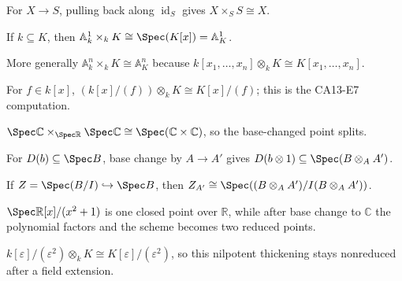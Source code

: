 \begin{example}\label{ex:vi24-r01}
For $X\to S$, pulling back along $\operatorname{id}_S$ gives $X\times_SS\cong X$.
\end{example}

\begin{example}\label{ex:vi24-r02}
If $k\subseteq K$, then $\mathbb A^1_k\times_kK\cong\Spec(K[x])=\mathbb A^1_K$.
\end{example}

\begin{example}\label{ex:vi24-r03}
More generally $\mathbb A^n_k\times_kK\cong\mathbb A^n_K$ because $k[x_1,\ldots,x_n]\otimes_kK\cong K[x_1,\ldots,x_n]$.
\end{example}

\begin{example}\label{ex:vi24-r04}
For $f\in k[x]$, $(k[x]/(f))\otimes_kK\cong K[x]/(f)$; this is the CA13-E7 computation.
\end{example}

\begin{example}\label{ex:vi24-r05}
$\Spec\mathbb C\times_{\Spec\mathbb R}\Spec\mathbb C\cong\Spec(\mathbb C\times\mathbb C)$, so the base-changed point splits.
\end{example}

\begin{example}\label{ex:vi24-r06}
For $D(b)\subseteq\Spec B$, base change by $A\to A'$ gives $D(b\otimes1)\subseteq\Spec(B\otimes_AA')$.
\end{example}

\begin{example}\label{ex:vi24-r07}
If $Z=\Spec(B/I)\hookrightarrow\Spec B$, then $Z_{A'}\cong\Spec((B\otimes_AA')/I(B\otimes_AA'))$.
\end{example}

\begin{example}\label{ex:vi24-r08}
$\Spec\mathbb R[x]/(x^2+1)$ is one closed point over $\mathbb R$, while after base change to $\mathbb C$ the polynomial factors and the scheme becomes two reduced points.
\end{example}

\begin{example}\label{ex:vi24-r09}
$k[\varepsilon]/(\varepsilon^2)\otimes_kK\cong K[\varepsilon]/(\varepsilon^2)$, so this nilpotent thickening stays nonreduced after a field extension.
\end{example}

